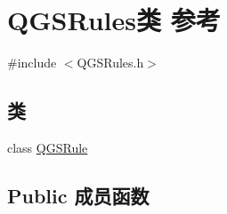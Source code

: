 \hypertarget{class_q_g_s_rules}{}\section{Q\+G\+S\+Rules类 参考}
\label{class_q_g_s_rules}


{\ttfamily \#include $<$Q\+G\+S\+Rules.\+h$>$}

\subsection*{类}
\begin{DoxyCompactItemize}
\item 
class \mbox{\hyperlink{class_q_g_s_rules_1_1_q_g_s_rule}{Q\+G\+S\+Rule}}
\end{DoxyCompactItemize}
\subsection*{Public 成员函数}

